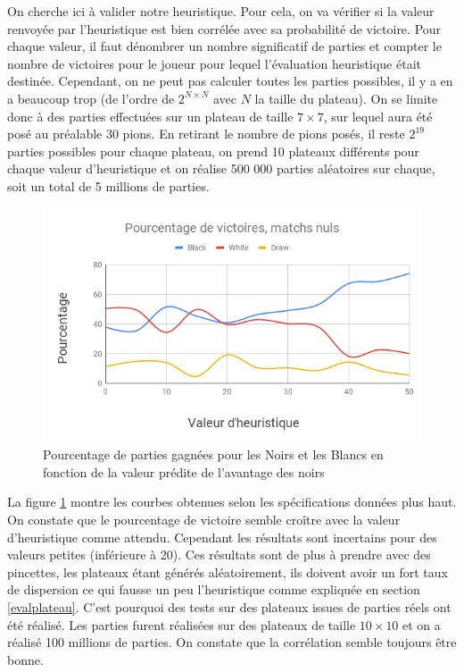 \documentclass[a4paper,11pt]{article}
\begin{document}
On cherche ici à valider notre heuristique. Pour cela, on va vérifier si la valeur renvoyée par l'heuristique est bien corrélée avec sa probabilité de victoire. Pour chaque valeur, il faut dénombrer un nombre significatif de parties et compter le nombre de victoires pour le joueur pour lequel l'évaluation heuristique était destinée. Cependant, on ne peut pas calculer toutes les parties possibles, il y a en a beaucoup trop (de l'ordre de $2^{N\times N}$ avec $N$ la taille du plateau). On se limite donc à des parties effectuées sur un plateau de taille $7 \times 7$, sur lequel aura été posé au préalable 30 pions. En retirant le nombre de pions posés, il reste $2^{19}$ parties possibles pour chaque plateau, on prend 10 plateaux différents pour chaque valeur d'heuristique et on réalise 500 000 parties aléatoires sur chaque, soit un total de 5 millions de parties.


\begin{figure}[h]
    \centering
    \includegraphics[scale=0.8]{Pourcentage_de_victoires_matchs_nuls.png}
    \caption{Pourcentage de parties gagnées pour les Noirs et les Blancs en fonction de la valeur prédite de l'avantage des noirs}
    \label{fig:stats1}
\end{figure}

La figure \ref{fig:stats1} montre les courbes obtenues selon les spécifications données plus haut. On constate que le pourcentage de victoire semble croître avec la valeur d'heuristique comme attendu. Cependant les résultats sont incertains pour des valeurs petites (inférieure à 20). Ces résultats sont de plus à prendre avec des pincettes, les plateaux étant générés aléatoirement, ils doivent avoir un fort taux de dispersion ce qui fausse un peu l'heuristique comme expliquée en section \ref{evalplateau}. C'est pourquoi des tests sur des plateaux issues de parties réels ont été réalisé. Les parties furent réalisées sur des plateaux de taille $10\times 10$ et on a réalisé 100 millions de parties. On constate que la corrélation semble toujours être bonne.
\end{document}
